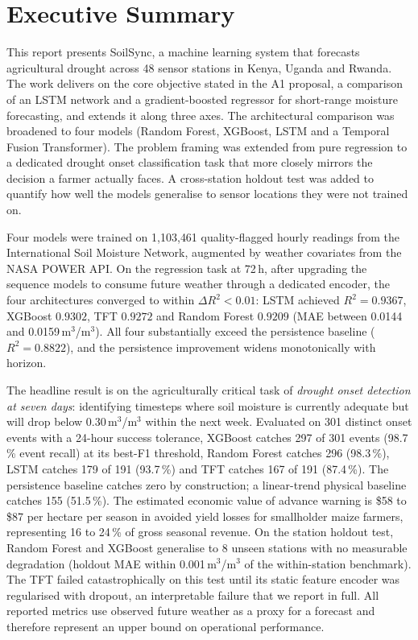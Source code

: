 \documentclass[12pt, a4paper]{article}
\begin{document}
\section*{Executive Summary}

This report presents SoilSync, a machine learning system that forecasts agricultural
drought across 48 sensor stations in Kenya, Uganda and Rwanda. The work delivers
on the core objective stated in the A1 proposal, a comparison of an LSTM
network and a gradient-boosted regressor for short-range moisture forecasting,
and extends it along three axes. The architectural comparison was broadened
to four models (Random Forest, XGBoost, LSTM and a Temporal Fusion Transformer).
The problem framing was extended from pure regression to a dedicated drought
onset classification task that more closely mirrors the decision a farmer actually
faces. A cross-station holdout test was added to quantify how well the models
generalise to sensor locations they were not trained on.

Four models were trained on 1{,}103{,}461 quality-flagged hourly readings from
the International Soil Moisture Network, augmented by weather covariates from
the NASA POWER API. On the regression task at 72\,h, after upgrading the
sequence models to consume future weather through a dedicated encoder, the four
architectures converged to within $\Delta R^2 < 0.01$: LSTM achieved
$R^2 = 0.9367$, XGBoost $0.9302$, TFT $0.9272$ and Random Forest $0.9209$
(MAE between 0.0144 and 0.0159\,m$^3$/m$^3$). All four substantially exceed
the persistence baseline ($R^2 = 0.8822$), and the persistence improvement
widens monotonically with horizon.

The headline result is on the agriculturally critical task of \emph{drought
onset detection at seven days}: identifying timesteps where soil moisture is
currently adequate but will drop below 0.30\,m$^3$/m$^3$ within the next week.
Evaluated on 301 distinct onset events with a 24-hour success tolerance,
XGBoost catches 297 of 301 events (98.7\,\% event recall) at its best-F1
threshold, Random Forest catches 296 (98.3\,\%), LSTM catches 179 of 191 (93.7\,\%)
and TFT catches 167 of 191 (87.4\,\%). The persistence baseline catches zero
by construction; a linear-trend physical baseline catches 155 (51.5\,\%).
The estimated economic value of advance warning is \$58 to \$87 per hectare
per season in avoided yield losses for smallholder maize farmers, representing
16 to 24\,\% of gross seasonal revenue. On the station holdout test, Random Forest
and XGBoost generalise to 8 unseen stations with no measurable degradation
(holdout MAE within 0.001\,m$^3$/m$^3$ of the within-station benchmark). The
TFT failed catastrophically on this test until its static feature encoder was
regularised with dropout, an interpretable failure that we report in full. All
reported metrics use observed future weather as a proxy for a forecast and
therefore represent an upper bound on operational performance.
\end{document}
